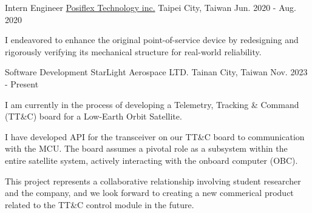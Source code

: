 

\begin{cventries}

  \cventry
    {Intern Engineer} %
    {\href{https://www.posiflex.com/en-global}{Posiflex Technology inc.}} %
    {Taipei City, Taiwan} %
    {Jun. 2020 - Aug. 2020} %
    {
      \begin{cvitems} %
        \item {I endeavored to enhance the original point-of-service device by redesigning and rigorously verifying its mechanical structure for real-world reliability.}
      \end{cvitems}
    }

  \cventry
    {Software Development} %
    {StarLight Aerospace LTD.} %
    {Tainan City, Taiwan} %
    {Nov. 2023 - Present} %
    {
      \begin{cvitems} %
        \item {I am currently in the process of developing a Telemetry, Tracking \& Command (TT\&C) board for a Low-Earth Orbit Satellite.}
        \item{I have developed API for the transceiver on our TT\&C board to communication with the MCU. The board assumes a pivotal role as a subsystem within the entire satellite system, actively interacting with the onboard computer (OBC).}
        \item{This project represents a collaborative relationship involving student researcher and the company, and we look forward to creating a new commerical product related to the TT\&C control module in the future.}
      \end{cvitems}
    }
    
\end{cventries}
